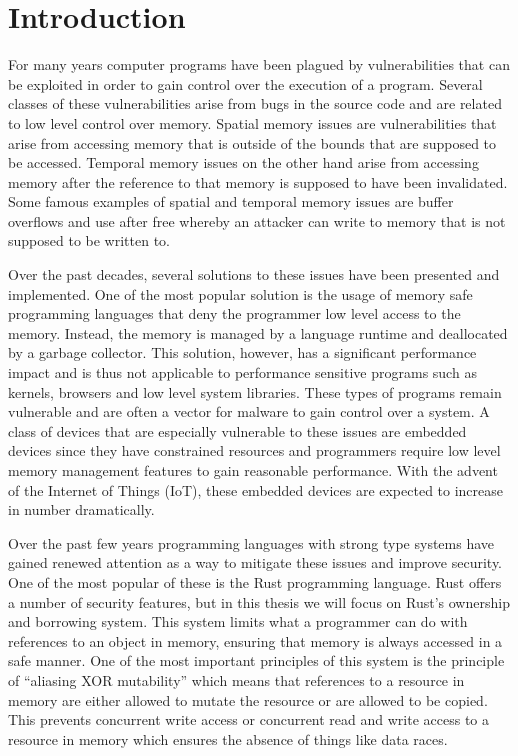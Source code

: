 \chapter{Introduction}
\label{cha:intro}
For many years computer programs have been plagued by vulnerabilities that can be exploited in order to gain control over the execution of a program.
Several classes of these vulnerabilities arise from bugs in the source code and are related to low level control over memory.
Spatial memory issues are vulnerabilities that arise from accessing memory that is outside of the bounds that are supposed to be accessed.
Temporal memory issues on the other hand arise from accessing memory after the reference to that memory is supposed to have been invalidated.
Some famous examples of spatial and temporal memory issues are buffer overflows and use after free whereby an attacker can write to memory that is not supposed to be written to.

Over the past decades, several solutions to these issues have been presented and implemented.
One of the most popular solution is the usage of memory safe programming languages that deny the programmer low level access to the memory.
Instead, the memory is managed by a language runtime and deallocated by a garbage collector.
This solution, however, has a significant performance impact and is thus not applicable to performance sensitive programs such as kernels, browsers and low level system libraries.
These types of programs remain vulnerable and are often a vector for malware to gain control over a system.
A class of devices that are especially vulnerable to these issues are embedded devices since they have constrained resources and programmers require low level memory management features to gain reasonable performance.
With the advent of the Internet of Things (IoT), these embedded devices are expected to increase in number dramatically.

Over the past few years programming languages with strong type systems have gained renewed attention as a way to mitigate these issues and improve security.
One of the most popular of these is the Rust programming language.
Rust offers a number of security features, but in this thesis we will focus on Rust's ownership and borrowing system.
This system limits what a programmer can do with references to an object in memory, ensuring that memory is always accessed in a safe manner.
One of the most important principles of this system is the principle of ``aliasing XOR mutability'' which means that references to a resource in memory are either allowed to mutate the resource or are allowed to be copied.
This prevents concurrent write access or concurrent read and write access to a resource in memory which ensures the absence of things like data races.

